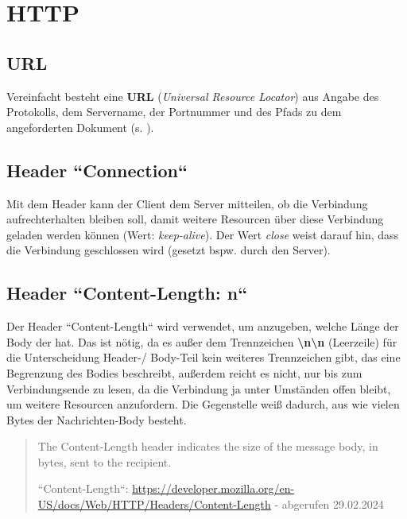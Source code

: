 \section{HTTP}

\subsection{URL}

Vereinfacht besteht eine \textbf{URL} (\textit{Universal Resource Locator}) aus Angabe des Protokolls, dem Servername, der Portnummer und des Pfads zu dem angeforderten Dokument (s. \cite[403]{Oec22}).

\subsection{Header ``Connection``}
Mit dem Header kann der Client dem Server mitteilen, ob die Verbindung aufrechterhalten bleiben soll, damit weitere Resourcen über diese Verbindung geladen werden können (Wert: \textit{keep-alive}).
Der Wert \textit{close} weist darauf hin, dass die Verbindung geschlossen wird (gesetzt bspw. durch den Server).

\subsection{Header ``Content-Length: n``}
Der Header ``Content-Length`` wird verwendet, um anzugeben, welche Länge der Body der hat.
Das ist nötig, da es außer dem Trennzeichen \textbf{\textbackslash n\textbackslash n} (Leerzeile) für die Unterscheidung Header-/ Body-Teil kein weiteres Trennzeichen gibt, das eine Begrenzung des Bodies beschreibt, außerdem reicht es nicht, nur bis zum Verbindungsende zu lesen, da die Verbindung ja unter Umständen offen bleibt, um weitere Resourcen anzufordern.
Die Gegenstelle weiß dadurch, aus wie vielen Bytes der Nachrichten-Body besteht.

\blockquote[{``Content-Length``: \url{https://developer.mozilla.org/en-US/docs/Web/HTTP/Headers/Content-Length} - abgerufen 29.02.2024}]{
    The Content-Length header indicates the size of the message body, in bytes, sent to the recipient.
}